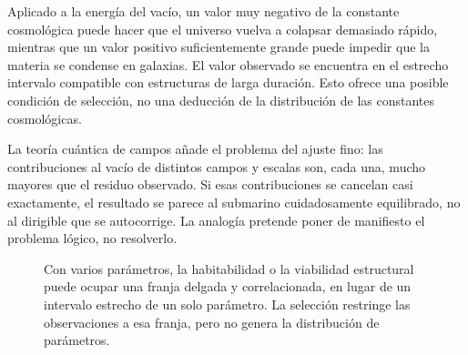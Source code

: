 Aplicado a la energía del vacío, un valor muy negativo de la constante cosmológica puede hacer que el universo vuelva a colapsar demasiado rápido, mientras que un valor positivo suficientemente grande puede impedir que la materia se condense en galaxias. El valor observado se encuentra en el estrecho intervalo compatible con estructuras de larga duración. Esto ofrece una posible condición de selección, no una deducción de la distribución de las constantes cosmológicas.

La teoría cuántica de campos añade el problema del ajuste fino: las contribuciones al vacío de distintos campos y escalas son, cada una, mucho mayores que el residuo observado. Si esas contribuciones se cancelan casi exactamente, el resultado se parece al submarino cuidadosamente equilibrado, no al dirigible que se autocorrige. La analogía pretende poner de manifiesto el problema lógico, no resolverlo.

\begin{classroomqa}
\end{classroomqa}

\begin{figure}[ht]\centering
{}\caption{Con varios parámetros, la habitabilidad o la viabilidad estructural puede ocupar una franja delgada y correlacionada, en lugar de un intervalo estrecho de un solo parámetro. La selección restringe las observaciones a esa franja, pero no genera la distribución de parámetros.}\label{fig:viable-parameter-band}\end{figure}

